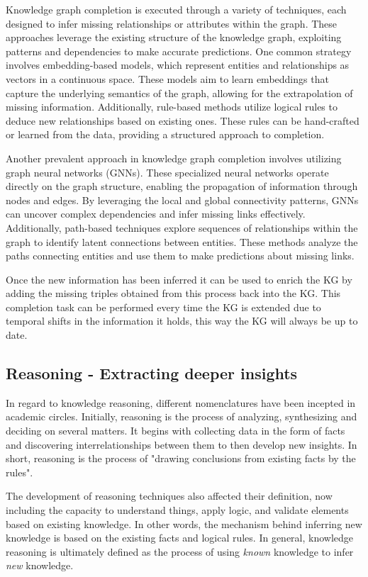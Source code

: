 Knowledge graph completion is executed through a variety of techniques, each designed to infer missing relationships or attributes within the graph. These approaches leverage the existing structure of the knowledge graph, exploiting patterns and dependencies to make accurate predictions. One common strategy involves embedding-based models, which represent entities and relationships as vectors in a continuous space. These models aim to learn embeddings that capture the underlying semantics of the graph, allowing for the extrapolation of missing information. Additionally, rule-based methods utilize logical rules to deduce new relationships based on existing ones. These rules can be hand-crafted or learned from the data, providing a structured approach to completion.

Another prevalent approach in knowledge graph completion involves utilizing graph neural networks (GNNs). These specialized neural networks operate directly on the graph structure, enabling the propagation of information through nodes and edges. By leveraging the local and global connectivity patterns, GNNs can uncover complex dependencies and infer missing links effectively. Additionally, path-based techniques explore sequences of relationships within the graph to identify latent connections between entities. These methods analyze the paths connecting entities and use them to make predictions about missing links.

Once the new information has been inferred it can be used to enrich the KG by adding the missing triples obtained from this process back into the KG. This completion task can be performed every time the KG is extended due to temporal shifts in the information it holds, this way the KG will always be up to date.

\subsection{Reasoning - Extracting deeper insights}

In regard to knowledge reasoning, different nomenclatures have been incepted in academic circles. Initially, reasoning is the process of analyzing, synthesizing and deciding on several matters. It begins with collecting data in the form of facts and discovering interrelationships between them to then develop new insights. In short, reasoning is the process of "drawing conclusions from existing facts by the rules"\cite{sutton2018reinforcement}.

The development of reasoning techniques also affected their definition, now including the capacity to understand things, apply logic, and validate elements based on existing knowledge. In other words, the mechanism behind inferring new knowledge is based on the existing facts and logical rules. In general, knowledge reasoning is ultimately defined as the process of using \textit{known} knowledge to infer \textit{new} knowledge.

